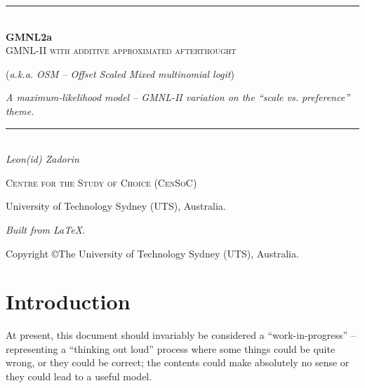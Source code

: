 \documentclass[12pt,a4paper]{article}
\begin{document}



\setlength{\parindent}{0pt}
\setlength{\parskip}{2ex}


\begin{titlepage}
\begin{center}



\vspace*{3cm}

\rule{\linewidth}{0.5mm} \\[0.4cm]
{ \huge \bfseries GMNL2a }\\[0.4cm]
{\large \textsc{GMNL-II with additive approximated afterthought}}

(\textit{a.k.a. OSM -- Offset Scaled Mixed multinomial logit})

{\large \emph{A maximum-likelihood model -- GMNL-II variation on the ``scale vs. preference'' theme.}}
\rule{\linewidth}{0.5mm}
\\[1.1cm]
\large
\textit{Leon(id) Zadorin}
\vspace{3cm}

{\Large \textsc{Centre for the Study of Choice (CenSoC)}}

{\large University of Technology Sydney (UTS), Australia.}


\vfill

\emph{Built from \LaTeX.} \\ 

Copyright \copyright  \space   \the\year \space The University of Technology Sydney (UTS), Australia.

\end{center}

\end{titlepage}

\newpage
\tableofcontents
\newpage
\section{Introduction}

At present, this document should invariably be considered a ``work-in-progress'' -- representing a ``thinking out loud'' process where some things could be quite wrong, or they could be correct; the contents could make absolutely no sense or they could lead to a useful model.
\end{document}
